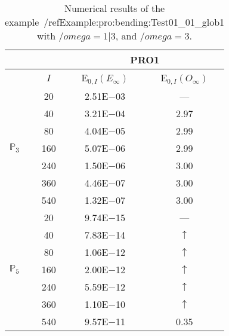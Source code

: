 \begin{table}[H]
\caption{Numerical results of the example~/ref{Example:pro:bending:Test01_01_glob1} with $/omega=1|3$, and $/omega=3$.}
\setlength{\tabcolsep}{5pt}
\centering
\begin{tabular}{@{}l c c c@{}}
\toprule
 &  & \multicolumn{2}{c}{PRO1}\\
\midrule
 & $I$ & E$_{0,I}(E_{\infty})$ & E$_{0,I}(O_{\infty})$\\
\midrule
\multirow{7}{*}{$\mathbb{P}_{3}$}
 & 20 & 2.51E$-$03 & ---\\
 & 40 & 3.21E$-$04 & 2.97\\
 & 80 & 4.04E$-$05 & 2.99\\
 & 160 & 5.07E$-$06 & 2.99\\
 & 240 & 1.50E$-$06 & 3.00\\
 & 360 & 4.46E$-$07 & 3.00\\
 & 540 & 1.32E$-$07 & 3.00\\
\midrule
\multirow{7}{*}{$\mathbb{P}_{5}$}
 & 20 & 9.74E$-$15 & ---\\
 & 40 & 7.83E$-$14 & $\uparrow$\\
 & 80 & 1.06E$-$12 & $\uparrow$\\
 & 160 & 2.00E$-$12 & $\uparrow$\\
 & 240 & 5.59E$-$12 & $\uparrow$\\
 & 360 & 1.10E$-$10 & $\uparrow$\\
 & 540 & 9.57E$-$11 & 0.35\\
\bottomrule
\end{tabular}
\label{Table:pRO:test_01_01_test11_pro2}
\end{table}
